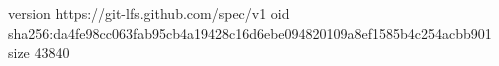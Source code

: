 version https://git-lfs.github.com/spec/v1
oid sha256:da4fe98cc063fab95cb4a19428c16d6ebe094820109a8ef1585b4c254acbb901
size 43840
